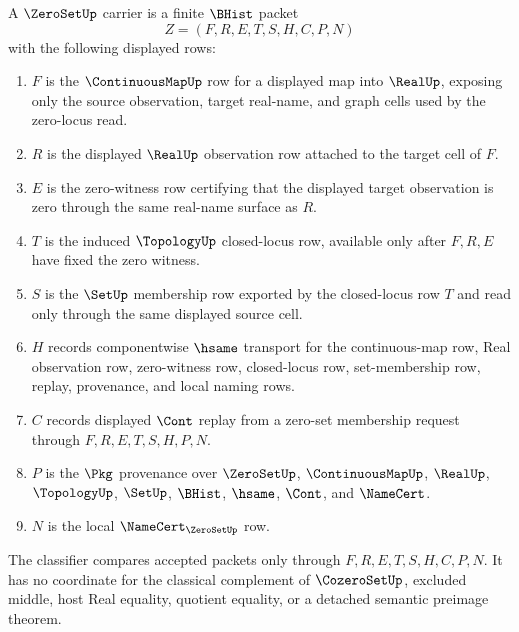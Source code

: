 \begin{definition}
\label{def:zero-set-carrier}
A $\ZeroSetUp$ carrier is a finite $\BHist$ packet
$$
Z=(F,R,E,T,S,H,C,P,N)
$$
with the following displayed rows:
\begin{enumerate}
\item $F$ is the $\ContinuousMapUp$ row for a displayed map into $\RealUp$, exposing only the source observation, target real-name, and graph cells used by the zero-locus read.
\item $R$ is the displayed $\RealUp$ observation row attached to the target cell of $F$.
\item $E$ is the zero-witness row certifying that the displayed target observation is zero through the same real-name surface as $R$.
\item $T$ is the induced $\TopologyUp$ closed-locus row, available only after $F,R,E$ have fixed the zero witness.
\item $S$ is the $\SetUp$ membership row exported by the closed-locus row $T$ and read only through the same displayed source cell.
\item $H$ records componentwise $\hsame$ transport for the continuous-map row, Real observation row, zero-witness row, closed-locus row, set-membership row, replay, provenance, and local naming rows.
\item $C$ records displayed $\Cont$ replay from a zero-set membership request through $F,R,E,T,S,H,P,N$.
\item $P$ is the $\Pkg$ provenance over $\ZeroSetUp$, $\ContinuousMapUp$, $\RealUp$, $\TopologyUp$, $\SetUp$, $\BHist$, $\hsame$, $\Cont$, and $\NameCert$.
\item $N$ is the local $\NameCert_{\ZeroSetUp}$ row.
\end{enumerate}
The classifier compares accepted packets only through $F,R,E,T,S,H,C,P,N$. It has no coordinate for the classical complement of $\CozeroSetUp$, excluded middle, host Real equality, quotient equality, or a detached semantic preimage theorem.
\end{definition}

